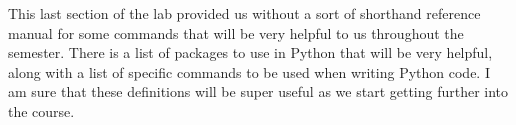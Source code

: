 This last section of the lab provided us without a sort of shorthand reference manual for some commands that will be very helpful to us throughout the semester. There is a list of packages to use in Python that will be very helpful, along with a list of specific commands to be used when writing Python code. I am sure that these definitions will be super useful as we start getting further into the course.